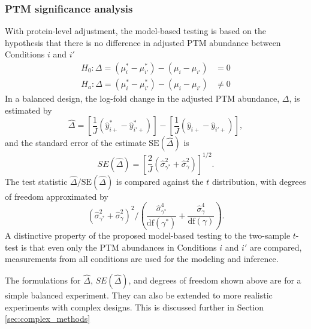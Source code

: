 \documentclass{mcp}
\begin{document}
\subsubsection{PTM significance analysis}
\label{sec:test}

With protein-level adjustment, the model-based testing is based on the hypothesis that there is no difference in adjusted PTM abundance between Conditions $i$ and $i'$
\begin{align*}
H_{0}: \Delta = \left( \mu_{i}^{\ast} - \mu_{i'}^{\ast} \right) - \left( \mu_{i} - \mu_{i'} \right) &= 0 \\
H_{a}: \Delta = \left( \mu_{i}^{\ast} - \mu_{i'}^{\ast} \right) - \left( \mu_{i} - \mu_{i'} \right) &\neq 0
\end{align*}
In a balanced design, the log-fold change in the adjusted PTM abundance, $\Delta$, is estimated by 
\[
\hat{\Delta} = \left[ \frac{1}{J} \left( \hat{y}_{i+}^{\ast} - \hat{y}_{i'+}^{\ast} \right) \right] - \left[ \frac{1}{J} \left( \hat{y}_{i+} - \hat{y}_{i'+} \right) \right],
\]
and the standard error of the estimate $\mathrm{SE}(\hat{\Delta})$ is 
\[
SE(\hat{\Delta}) = \left[ \frac{2}{J} \left( \hat{\sigma}_{\gamma^{\ast}}^{2} + \hat{\sigma}_{\gamma}^{2} \right) \right]^{1/2}.
\]
The test statistic $\hat{\Delta} / \mathrm{SE}(\hat{\Delta})$ is compared against the $t$ distribution, with degrees of freedom approximated by
\[
\left( \hat{\sigma}_{\gamma^{\ast}}^{2} + \hat{\sigma}_{\gamma}^{2} \right)^2 \bigg/
\left( \frac{\hat{\sigma}_{\gamma^{\ast}}^{4}}{\mathrm{df}(\gamma^{\ast})} + \frac{\hat{\sigma}_{\gamma}^{4}}{ \mathrm{df}(\gamma)} \right).
\]
A distinctive property of the proposed model-based testing to the two-sample $t$-test is that even only the PTM abundances in Conditions $i$ and $i'$ are compared, measurements from all conditions are used for the modeling and inference.

The formulations for $\hat{\Delta}$, $SE(\hat{\Delta})$, and degrees of freedom shown above are for a simple balanced experiment. They can also be extended to more realistic experiments with complex designs. This is discussed further in Section \ref{sec:complex_methods}


\end{document}
